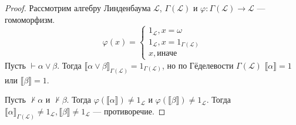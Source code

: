 \begin{proof}
    Рассмотрим алгебру Линденбаума \(\mathcal{L}\), \(\Gamma(\mathcal{L})\) и \(\varphi : \Gamma(\mathcal{L}) \to \mathcal{L}\) --- гомоморфизм.
    \[\varphi(x) = \begin{cases}
            1_\mathcal{L}, x = \omega                  \\
            1_\mathcal{L}, x = 1_{\Gamma(\mathcal{L})} \\
            x, \text{иначе}
        \end{cases}\]
    Пусть \(\vdash \alpha \lor \beta\). Тогда \(\llbracket \alpha \lor \beta \rrbracket_{\Gamma(\mathcal{L})} = 1_{\Gamma(\mathcal{L})}\), но по Гёделевости \(\Gamma(\mathcal{L})\) \(\llbracket \alpha \rrbracket = 1\) или \(\llbracket \beta \rrbracket = 1\).

    Пусть \(\nvdash \alpha\) и \(\nvdash \beta\). Тогда \(\varphi(\llbracket \alpha \rrbracket) \neq 1_{\mathcal{L}}\) и \(\varphi(\llbracket \beta \rrbracket) \neq 1_{\mathcal{L}}\). Тогда \(\llbracket \alpha \rrbracket_{\Gamma(\mathcal{L})} \neq 1_\mathcal{L}, \llbracket \beta \rrbracket \neq 1_\mathcal{L}\) --- противоречие.
\end{proof}


